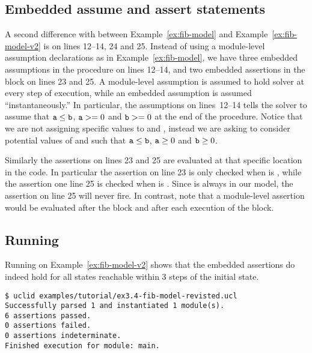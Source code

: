 \subsection{Embedded assume and assert statements}

A second difference with between Example~\ref{ex:fib-model} and Example~\ref{ex:fib-model-v2} is on lines 12--14, 24 and 25.  Instead of using a module-level assumption declarations as in Example~\ref{ex:fib-model}, we have three embedded assumptions in the  procedure on lines 12--14, and two embedded assertions in the  block on lines 23 and 25. A module-level assumption is assumed to hold solver at every step of execution, while an embedded assumption is assumed ``instantaneously.'' In particular, the assumptions on lines~12--14 tells the solver to assume that $\texttt{a} \leq \texttt{b}$, $\texttt{a} >= 0$ and $\texttt{b} >= 0$ at the end of the  procedure. Notice that we are not assigning specific values to  and , instead we are asking \uclid{} to consider potential values of  and  such that $\texttt{a} \leq \texttt{b}$, $\texttt{a} \geq 0$ and $\texttt{b} \geq 0$.

Similarly the assertions on lines 23 and 25 are evaluated at that specific location in the code. In particular the assertion on line 23 is only checked when  is , while the assertion one line 25 is checked when  is . Since  is always  in our model, the assertion on line 25 will never fire. In contrast, note that a module-level assertion would be evaluated after the  block and after each execution of the  block.

\subsection{Running \uclid{}}

Running \uclid{} on Example~\ref{ex:fib-model-v2} shows that the embedded assertions do indeed hold for all states reachable within 3 steps of the initial state.

\begin{Verbatim}[frame=single, samepage=true]
$ uclid examples/tutorial/ex3.4-fib-model-revisted.ucl 
Successfully parsed 1 and instantiated 1 module(s).
6 assertions passed.
0 assertions failed.
0 assertions indeterminate.
Finished execution for module: main.
\end{Verbatim}

